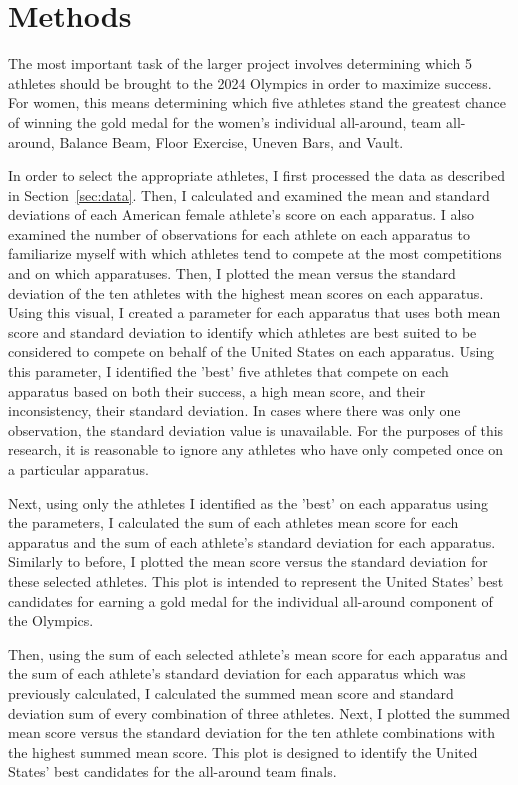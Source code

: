 \documentclass[12pt]{article}
\begin{document}
\section{Methods}
\label{sec:meth}

The most important task of the larger project involves determining which 5 athletes
should be brought to the 2024 Olympics in order to maximize success. For women, this means determining 
which five athletes stand the greatest chance of winning the gold medal for the women's individual all-around,
team all-around, Balance Beam, Floor Exercise, Uneven Bars, and Vault. 

In order to select the appropriate athletes, I first processed the data as described in Section~\ref{sec:data}.
Then, I calculated and examined the mean and standard deviations of each American female athlete's score 
on each apparatus. I also examined the number of observations for each athlete on each apparatus to familiarize 
myself with which athletes tend to compete at the most competitions and on which apparatuses. Then, I plotted 
the mean versus the standard deviation of the ten athletes with the highest mean scores on each apparatus. 
Using this visual, I created a parameter for each apparatus that uses both mean score and standard 
deviation to identify which athletes are best suited to be considered to compete on behalf of the United 
States on each apparatus. Using this parameter, I identified the 'best' five athletes that compete on
each apparatus based on both their success, a high mean score, and their inconsistency, their standard deviation. 
In cases where there was only one observation, the standard deviation value is unavailable.
For the purposes of this research, it is reasonable to ignore any athletes who have only competed once on a particular apparatus.

Next, using only the athletes I identified as the 'best' on each apparatus using the parameters, 
I calculated the sum of each athletes mean score for each apparatus and the sum of each athlete's standard 
deviation for each apparatus. Similarly to before, I plotted the mean score versus the standard deviation for 
these selected athletes. This plot is intended to represent
the United States' best candidates for earning a gold medal for the individual all-around component of the Olympics.

Then, using the sum of each selected athlete's mean score for each apparatus and the sum of each athlete's standard 
deviation for each apparatus which was previously calculated, I calculated the summed mean score and standard deviation sum 
of every combination of three athletes. Next, I plotted the summed mean score versus the standard deviation for the ten 
athlete combinations with the highest summed mean score. This plot is designed to identify the United States' best 
candidates for the all-around team finals.
\end{document}
